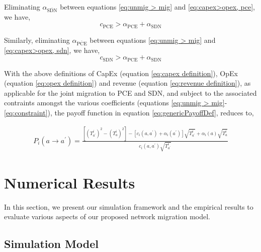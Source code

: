 \documentclass[smallextended]{svjour3}
\begin{document}
\par Eliminating $\alpha_{\overline{\textrm{SDN}}}$ between equations
\eqref{eq:unmig > mig} and \eqref{eq:capex>opex, pce}, we have,
\begin{equation}
c_\textrm{PCE} > \alpha_\textrm{PCE}+\alpha_\textrm{SDN}
\end{equation}

Similarly, eliminating $\alpha_{\overline{\textrm{PCE}}}$ between equations
\eqref{eq:unmig > mig} and \eqref{eq:capex>opex, sdn}, we have,
\begin{equation} \label{eq:constraint}
c_\textrm{SDN} > \alpha_\textrm{PCE}+\alpha_\textrm{SDN}
\end{equation}

\par With the above definitions of CapEx (equation \eqref{eq:capex definition}),
OpEx (equation \eqref{eq:opex definition}) and revenue (equation
\eqref{eq:revenue definition}), as applicable for the joint migration to PCE and
SDN, and subject to the associated contraints amongst the various coefficients
(equations \eqref{eq:unmig > mig}-\eqref{eq:constraint}), the payoff function in equation
\eqref{eq:genericPayoffDef}, reduces to,

\begin{multline}
P_i({a \to a^\prime})=
\frac{[(T_{a^\prime}^i)^2-(T_{a}^i)^2] - [c_i(a,a^\prime)+\alpha_i(a^\prime)]\sqrt{T_{a^\prime}^i}+\alpha_i(a)\sqrt{T_a^i}}{c_i(a,a^\prime)\sqrt{T_{a^\prime}^i}}
\end{multline}

\section{Numerical Results} \label{sec:rd}
In this section, we present our simulation framework and the empirical
results to evaluate various aspects of our proposed network migration model.

\subsection{Simulation Model}
\end{document}
